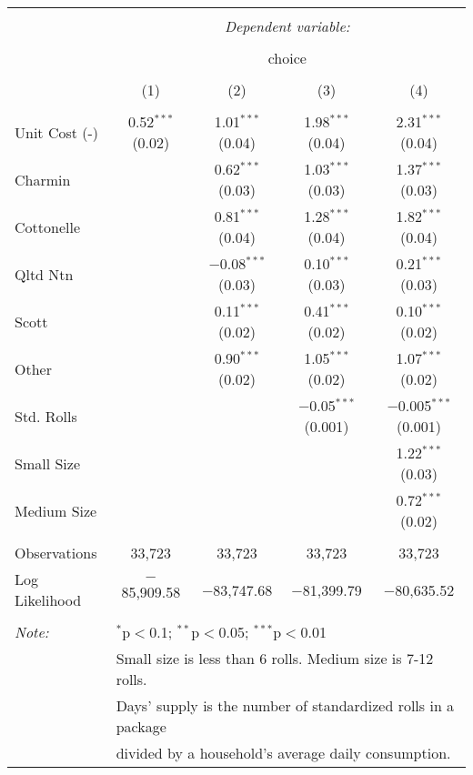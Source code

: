 
\begin{table}[!htbp] \centering 
  \caption{} 
  \label{tab:mnlBostonBaseline} 
\begin{tabular}{@{\extracolsep{5pt}}lcccc} 
\\[-1.8ex]\hline 
\hline \\[-1.8ex] 
 & \multicolumn{4}{c}{\textit{Dependent variable:}} \\ 
\cline{2-5} 
\\[-1.8ex] & \multicolumn{4}{c}{choice} \\ 
\\[-1.8ex] & (1) & (2) & (3) & (4)\\ 
\hline \\[-1.8ex] 
 Unit Cost (-) & 0.52$^{***}$ (0.02) & 1.01$^{***}$ (0.04) & 1.98$^{***}$ (0.04) & 2.31$^{***}$ (0.04) \\ 
  Charmin &  & 0.62$^{***}$ (0.03) & 1.03$^{***}$ (0.03) & 1.37$^{***}$ (0.03) \\ 
  Cottonelle &  & 0.81$^{***}$ (0.04) & 1.28$^{***}$ (0.04) & 1.82$^{***}$ (0.04) \\ 
  Qltd Ntn &  & $-$0.08$^{***}$ (0.03) & 0.10$^{***}$ (0.03) & 0.21$^{***}$ (0.03) \\ 
  Scott &  & 0.11$^{***}$ (0.02) & 0.41$^{***}$ (0.02) & 0.10$^{***}$ (0.02) \\ 
  Other &  & 0.90$^{***}$ (0.02) & 1.05$^{***}$ (0.02) & 1.07$^{***}$ (0.02) \\ 
  Std. Rolls &  &  & $-$0.05$^{***}$ (0.001) & $-$0.005$^{***}$ (0.001) \\ 
  Small Size &  &  &  & 1.22$^{***}$ (0.03) \\ 
  Medium Size &  &  &  & 0.72$^{***}$ (0.02) \\ 
 \hline \\[-1.8ex] 
Observations & 33,723 & 33,723 & 33,723 & 33,723 \\ 
Log Likelihood & $-$85,909.58 & $-$83,747.68 & $-$81,399.79 & $-$80,635.52 \\ 
\hline 
\hline \\[-1.8ex] 
\textit{Note:}  & \multicolumn{4}{l}{$^{*}$p$<$0.1; $^{**}$p$<$0.05; $^{***}$p$<$0.01} \\ 
 & \multicolumn{4}{l}{Small size is less than 6 rolls. Medium size is 7-12 rolls. } \\ 
 & \multicolumn{4}{l}{Days' supply is the number of standardized rolls in a package} \\ 
 & \multicolumn{4}{l}{divided by a household's average daily consumption.} \\ 
\end{tabular} 
\end{table} 
